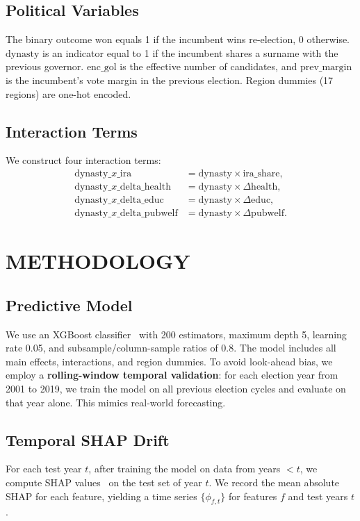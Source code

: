 \documentclass[conference]{IEEEtran}
\begin{document}
\subsection{Political Variables}
The binary outcome $\text{won}$ equals 1 if the incumbent wins re-election, 0 otherwise. $\text{dynasty}$ is an indicator equal to 1 if the incumbent shares a surname with the previous governor. $\text{enc\_gol}$ is the effective number of candidates, and $\text{prev\_margin}$ is the incumbent's vote margin in the previous election. Region dummies (17 regions) are one-hot encoded.

\subsection{Interaction Terms}
We construct four interaction terms:
\begin{align*}
\text{dynasty}\_x\_\text{ira} &= \text{dynasty} \times \text{ira\_share}, \\
\text{dynasty}\_x\_\text{delta\_health} &= \text{dynasty} \times \Delta\text{health},\\
\text{dynasty}\_x\_\text{delta\_educ} &= \text{dynasty} \times \Delta\text{educ},\\
\text{dynasty}\_x\_\text{delta\_pubwelf} &= \text{dynasty} \times \Delta\text{pubwelf}.
\end{align*}

\section{METHODOLOGY}

\subsection{Predictive Model}
We use an XGBoost classifier~\cite{chen2016} with 200 estimators, maximum depth 5, learning rate 0.05, and subsample/column-sample ratios of 0.8. The model includes all main effects, interactions, and region dummies. To avoid look-ahead bias, we employ a \textbf{rolling-window temporal validation}: for each election year from 2001 to 2019, we train the model on all previous election cycles and evaluate on that year alone. This mimics real-world forecasting.

\subsection{Temporal SHAP Drift}
For each test year $t$, after training the model on data from years $< t$, we compute SHAP values~\cite{lundberg2017} on the test set of year $t$. We record the mean absolute SHAP for each feature, yielding a time series $\{\phi_{f,t}\}$ for features $f$ and test years $t$.
\end{document}
